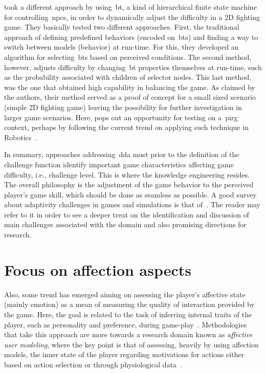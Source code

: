 \cite{sejrsgaard-jacobsen_dynamic_2011} took a different approach by using~\gls{bt}, a kind of hierarchical finite state machine for controlling~\gls{npc}s, in order to dynamically adjust the difficulty in a 2D fighting game. They basically tested two different approaches. First, the traditional approach of defining predefined behaviors (encoded on~\gls{bt}s) and finding a way to switch between models (behavior) at run-time. For this, they developed an algorithm for selecting~\gls{bt}s based on perceived conditions. The second method, however, adjusts difficulty by changing~\gls{bt} properties themselves at run-time, such as the probability associated with children of selector nodes. This last method, was the one that obtained high capability in balancing the game. As claimed by the authors, their method served as a proof of concept for a small sized scenario (simple 2D fighting game) leaving the possibility for further investigation in larger game scenarios. Here, pops out an opportunity for testing on a~\gls{pirg} context, perhaps by following the current trend on applying such technique in Robotics~\citep{scheper_behavior_2015, pereira_framework_2015, marzinotto_towards_2014}.

In summary, approaches addressing~\gls{dda} must prior to the definition of the challenge function identify important game characteristics affecting game difficulty, i.e., challenge level. This is where the knowledge engineering resides. The overall philosophy is the adjustment of the game behavior to the perceived player's game skill, which should be done as seamless as possible. A good survey about adaptivity challenges in games and simulations is that of~\cite{lopes_adaptivity_2011}. The reader may refer to it in order to see a deeper treat on the identification and discussion of main challenges associated with the domain and also promising directions for research.

\section{Focus on affection aspects}\label{affectmodeling}
Also, some trend has emerged aiming on assessing the player's affective state (mainly emotion) as a mean of measuring the quality of interaction provided by the game. Here, the goal is related to the task of inferring internal traits of the player, such as personality and preference, during game-play~\citep{van_lankveld_psychologically_2009}. Methodologies that take this approach are more towards a research domain known as \textit{affective user modeling}, where the key point is that of assessing, heavily by using affection models, the inner state of the player regarding motivations for actions either based on action selection or through physiological data~\citep{van_lankveld_psychologically_2009}.

